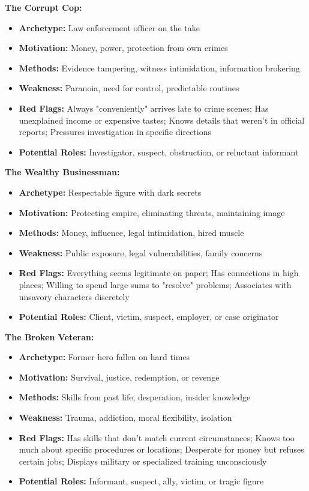 \documentclass[11pt]{article}
\begin{document}
\textbf{The Corrupt Cop:}
\begin{itemize}
    \item \textbf{Archetype:} Law enforcement officer on the take
    \item \textbf{Motivation:} Money, power, protection from own crimes
    \item \textbf{Methods:} Evidence tampering, witness intimidation, information brokering
    \item \textbf{Weakness:} Paranoia, need for control, predictable routines
    \item \textbf{Red Flags:} Always "conveniently" arrives late to crime scenes; Has unexplained income or expensive tastes; Knows details that weren't in official reports; Pressures investigation in specific directions
    \item \textbf{Potential Roles:} Investigator, suspect, obstruction, or reluctant informant
\end{itemize}

\textbf{The Wealthy Businessman:}
\begin{itemize}
    \item \textbf{Archetype:} Respectable figure with dark secrets
    \item \textbf{Motivation:} Protecting empire, eliminating threats, maintaining image
    \item \textbf{Methods:} Money, influence, legal intimidation, hired muscle
    \item \textbf{Weakness:} Public exposure, legal vulnerabilities, family concerns
    \item \textbf{Red Flags:} Everything seems legitimate on paper; Has connections in high places; Willing to spend large sums to "resolve" problems; Associates with unsavory characters discretely
    \item \textbf{Potential Roles:} Client, victim, suspect, employer, or case originator
\end{itemize}

\textbf{The Broken Veteran:}
\begin{itemize}
    \item \textbf{Archetype:} Former hero fallen on hard times
    \item \textbf{Motivation:} Survival, justice, redemption, or revenge
    \item \textbf{Methods:} Skills from past life, desperation, insider knowledge
    \item \textbf{Weakness:} Trauma, addiction, moral flexibility, isolation
    \item \textbf{Red Flags:} Has skills that don't match current circumstances; Knows too much about specific procedures or locations; Desperate for money but refuses certain jobs; Displays military or specialized training unconsciously
    \item \textbf{Potential Roles:} Informant, suspect, ally, victim, or tragic figure
\end{itemize}
\end{document}
